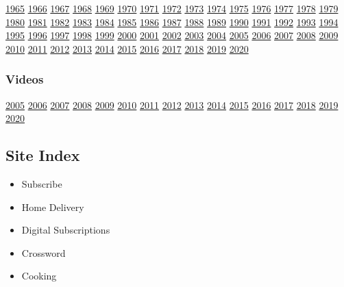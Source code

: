 \href{1965/}{1965} \href{1966/}{1966} \href{1967/}{1967}
\href{1968/}{1968} \href{1969/}{1969} \href{1970/}{1970}
\href{1971/}{1971} \href{1972/}{1972} \href{1973/}{1973}
\href{1974/}{1974} \href{1975/}{1975} \href{1976/}{1976}
\href{1977/}{1977} \href{1978/}{1978} \href{1979/}{1979}
\href{1980/}{1980} \href{1981/}{1981} \href{1982/}{1982}
\href{1983/}{1983} \href{1984/}{1984} \href{1985/}{1985}
\href{1986/}{1986} \href{1987/}{1987} \href{1988/}{1988}
\href{1989/}{1989} \href{1990/}{1990} \href{1991/}{1991}
\href{1992/}{1992} \href{1993/}{1993} \href{1994/}{1994}
\href{1995/}{1995} \href{1996/}{1996} \href{1997/}{1997}
\href{1998/}{1998} \href{1999/}{1999} \href{2000/}{2000}
\href{2001/}{2001} \href{2002/}{2002} \href{2003/}{2003}
\href{2004/}{2004} \href{2005/}{2005} \href{2006/}{2006}
\href{2007/}{2007} \href{2008/}{2008} \href{2009/}{2009}
\href{2010/}{2010} \href{2011/}{2011} \href{2012/}{2012}
\href{2013/}{2013} \href{2014/}{2014} \href{2015/}{2015}
\href{2016/}{2016} \href{2017/}{2017} \href{2018/}{2018}
\href{2019/}{2019} \href{2020/}{2020}

\hypertarget{videos}{%
\subsubsection{Videos}\label{videos}}

\href{video_2005/index.html}{2005} \href{video_2006/index.html}{2006}
\href{video_2007/index.html}{2007} \href{video_2008/index.html}{2008}
\href{video_2009/index.html}{2009} \href{video_2010/index.html}{2010}
\href{video_2011/index.html}{2011} \href{video_2012/index.html}{2012}
\href{video_2013/index.html}{2013} \href{video_2014/index.html}{2014}
\href{video_2015/index.html}{2015} \href{video_2016/index.html}{2016}
\href{video_2017/index.html}{2017} \href{video_2018/index.html}{2018}
\href{video_2019/index.html}{2019} \href{video_2020/index.html}{2020}

\hypertarget{site-index}{%
\subsection{Site Index}\label{site-index}}

\begin{itemize}
\tightlist
\item
  Subscribe
\item
  Home Delivery
\item
  Digital Subscriptions
\item
  Crossword
\item
  Cooking
\end{itemize}

